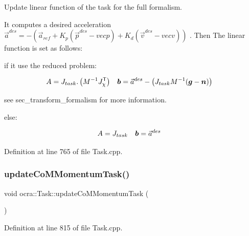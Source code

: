 Update linear function of the task for the full formalism.

It computes a desired acceleration $ \vec{a}^{des} = - \left( \vec{a}_{ref} + K_p (\vec{p}^{des} - vec{p}) + K_d (\vec{v}^{des} - vec{v}) \right) $ . Then The linear function is set as follows\+:


\begin{DoxyItemize}
\item if it use the reduced problem\+:

\begin{align*} A &= J_{task} . \left( M^{-1} J_{\chi}^{\mathsf{T}} \right) & \mbox{\boldmath${b}$} &= \vec{a}^{des} - \left( J_{task} M^{-1} ( \mbox{\boldmath${g}$} - \mbox{\boldmath${n}$}) \right) \end{align*}
\end{DoxyItemize}

see sec\+\_\+transform\+\_\+formalism for more information.


\begin{DoxyItemize}
\item else\+:

\begin{align*} A &= J_{task} & \mbox{\boldmath${b}$} &= \vec{a}^{des} \end{align*} 
\end{DoxyItemize}

Definition at line 765 of file Task.\+cpp.

\hypertarget{classocra_1_1Task_a2cfddc40424cb0edd08defe5df48addf}{}\label{classocra_1_1Task_a2cfddc40424cb0edd08defe5df48addf} 
\subsubsection{\texorpdfstring{update\+Co\+M\+Momentum\+Task()}{updateCoMMomentumTask()}}
{\footnotesize\ttfamily void ocra\+::\+Task\+::update\+Co\+M\+Momentum\+Task (\begin{DoxyParamCaption}{ }\end{DoxyParamCaption})\hspace{0.3cm}{\ttfamily [protected]}}



Definition at line 815 of file Task.\+cpp.

\hypertarget{classocra_1_1Task_a49af52acac5f23a6fc51c071271ae6ea}{}\label{classocra_1_1Task_a49af52acac5f23a6fc51c071271ae6ea} 
